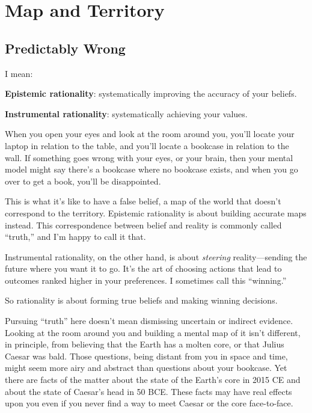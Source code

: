 \part{Map and Territory}


\chapter{Predictably Wrong}


{
 I mean:}

{
 \textbf{Epistemic rationality}: systematically improving the
accuracy of your beliefs.}

{
 \textbf{Instrumental rationality}: systematically achieving your
values.}

{
 When you open your eyes and look at the room around you,
you'll locate your laptop in relation to the table, and
you'll locate a bookcase in relation to the wall. If
something goes wrong with your eyes, or your brain, then your mental
model might say there's a bookcase where no bookcase
exists, and when you go over to get a book, you'll be
disappointed.}

{
 This is what it's like to have a false belief, a
map of the world that doesn't correspond to the
territory. Epistemic rationality is about building accurate maps
instead. This correspondence between belief and reality is commonly
called ``truth,'' and
I'm happy to call it that.}

{
 Instrumental rationality, on the other hand, is about
\textit{steering} reality---sending the future where you want it to go.
It's the art of choosing actions that lead to outcomes
ranked higher in your preferences. I sometimes call this
``winning.''}

{
 So rationality is about forming true beliefs and making winning
decisions.}

{
 Pursuing ``truth'' here
doesn't mean dismissing uncertain or indirect evidence.
Looking at the room around you and building a mental map of it
isn't different, in principle, from believing that the
Earth has a molten core, or that Julius Caesar was bald. Those
questions, being distant from you in space and time, might seem more
airy and abstract than questions about your bookcase. Yet there are
facts of the matter about the state of the Earth's core
in 2015 CE and about the state of Caesar's head in 50
BCE. These facts may have real effects upon you even if you never find
a way to meet Caesar or the core face-to-face.}

